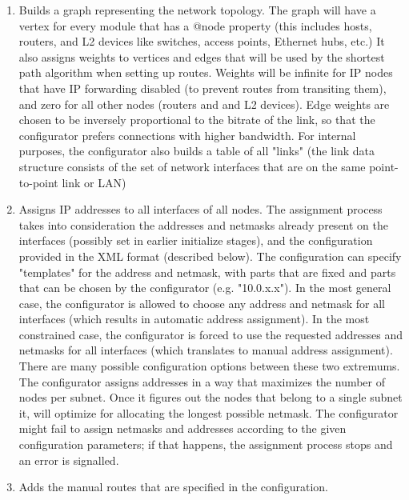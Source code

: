 \begin{enumerate}
  \item  Builds a graph representing the network topology. The graph
     will have a vertex for every module that has a @node property (this
     includes hosts, routers, and L2 devices like switches, access points,
     Ethernet hubs, etc.) It also assigns weights to vertices and edges that
     will be used by the shortest path algorithm when setting up routes.
     Weights will be infinite for IP nodes that have IP forwarding disabled
     (to prevent routes from transiting them), and zero for all other nodes
     (routers and and L2 devices). Edge weights are chosen to be inversely
     proportional to the bitrate of the link, so that the configurator
     prefers connections with higher bandwidth. For internal purposes,
     the configurator also builds a table of all "links" (the link data
     structure consists of the set of network interfaces that are
     on the same point-to-point link or LAN)

  \item  Assigns IP addresses to all interfaces of all nodes. The
     assignment process takes into consideration the addresses and netmasks
     already present on the interfaces (possibly set in earlier initialize
     stages), and the configuration provided in the XML format (described
     below). The configuration can specify "templates" for the address
     and netmask, with parts that are fixed and parts that can be chosen
     by the configurator (e.g. "10.0.x.x"). In the most general case,
     the configurator is allowed to choose any address and netmask for all
     interfaces (which results in automatic address assignment). In the most
     constrained case, the configurator is forced to use the requested addresses
     and netmasks for all interfaces (which translates to manual address assignment).
     There are many possible configuration options between these two extremums. The
     configurator assigns addresses in a way that maximizes the number of
     nodes per subnet. Once it figures out the nodes that belong to a single
     subnet it, will optimize for allocating the longest possible netmask.
     The configurator might fail to assign netmasks and addresses according
     to the given configuration parameters; if that happens, the assignment
     process stops and an error is signalled.

  \item  Adds the manual routes that are specified in the configuration.


\end{enumerate}
